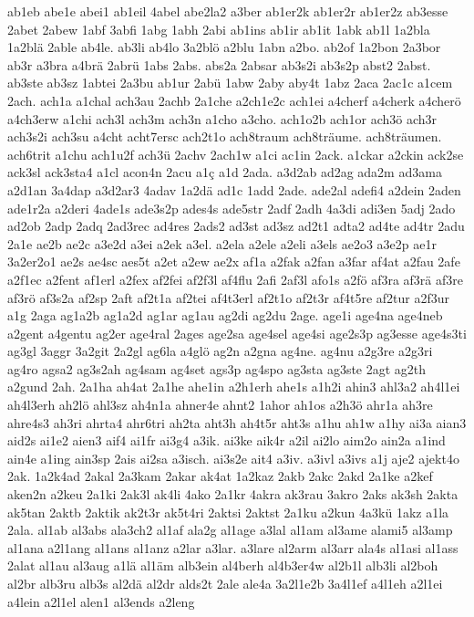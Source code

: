 {ab1eb
abe1e
abei1
ab1eil
4abel
abe2la2
a3ber
ab1er2k
ab1er2r
ab1er2z
ab3esse
2abet
2abew
1abf
3abfi
1abg
1abh
2abi
ab1ins
ab1ir
ab1it
1abk
ab1l
1a2bla
1a2blä
2able
ab4le.
ab3li
ab4lo
3a2blö
a2blu
1abn
a2bo.
ab2of
1a2bon
2a3bor
ab3r
a3bra
a4brä
2abrü
1abs
2abs.
abs2a
2absar
ab3s2i
ab3s2p
abst2
2abst.
ab3ste
ab3sz
1abtei
2a3bu
ab1ur
2abü
1abw
2aby
aby4t
1abz
2aca
2ac1c
a1cem
2ach.
ach1a
a1chal
ach3au
2achb
2a1che
a2ch1e2c
ach1ei
a4cherf
a4cherk
a4cherö
a4ch3erw
a1chi
ach3l
ach3m
ach3n
a1cho
a3cho.
ach1o2b
ach1or
ach3ö
ach3r
ach3s2i
ach3su
a4cht
acht7ersc
ach2t1o
ach8traum
ach8träume.
ach8träumen.
ach6trit
a1chu
ach1u2f
ach3ü
2achv
2ach1w
a1ci
ac1in
2ack.
a1ckar
a2ckin
ack2se
ack3sl
ack3sta4
a1cl
acon4n
2acu
a1ç
a1d
2ada.
a3d2ab
ad2ag
ada2m
ad3ama
a2d1an
3a4dap
a3d2ar3
4adav
1a2dä
ad1c
1add
2ade.
ade2al
adefi4
a2dein
2aden
ade1r2a
a2deri
4ade1s
ade3s2p
ades4s
ade5str
2adf
2adh
4a3di
adi3en
5adj
2ado
ad2ob
2adp
2adq
2ad3rec
ad4res
2ads2
ad3st
ad3sz
ad2t1
adta2
ad4te
ad4tr
2adu
2a1e
ae2b
ae2c
a3e2d
a3ei
a2ek
a3el.
a2ela
a2ele
a2eli
a3els
ae2o3
a3e2p
ae1r
3a2er2o1
ae2s
ae4sc
aes5t
a2et
a2ew
ae2x
af1a
a2fak
a2fan
a3far
af4at
a2fau
2afe
a2f1ec
a2fent
af1erl
a2fex
af2fei
af2f3l
af4flu
2afi
2af3l
afo1s
a2fö
af3ra
af3rä
af3re
af3rö
af3s2a
af2sp
2aft
af2t1a
af2tei
af4t3erl
af2t1o
af2t3r
af4t5re
af2tur
a2f3ur
a1g
2aga
ag1a2b
ag1a2d
ag1ar
ag1au
ag2di
ag2du
2age.
age1i
age4na
age4neb
a2gent
a4gentu
ag2er
age4ral
2ages
age2sa
age4sel
age4si
age2s3p
ag3esse
age4s3ti
ag3gl
3aggr
3a2git
2a2gl
ag6la
a4glö
ag2n
a2gna
ag4ne.
ag4nu
a2g3re
a2g3ri
ag4ro
agsa2
ag3s2ah
ag4sam
ag4set
ags3p
ag4spo
ag3sta
ag3ste
2agt
ag2th
a2gund
2ah.
2a1ha
ah4at
2a1he
ahe1in
a2h1erh
ahe1s
a1h2i
ahin3
ahl3a2
ah4l1ei
ah4l3erh
ah2lö
ahl3sz
ah4n1a
ahner4e
ahnt2
1ahor
ah1os
a2h3ö
ahr1a
ah3re
ahre4s3
ah3ri
ahrta4
ahr6tri
ah2ta
aht3h
ah4t5r
aht3s
a1hu
ah1w
a1hy
ai3a
aian3
aid2s
ai1e2
aien3
aif4
ai1fr
ai3g4
a3ik.
ai3ke
aik4r
a2il
ai2lo
aim2o
ain2a
a1ind
ain4e
a1ing
ain3sp
2ais
ai2sa
a3isch.
ai3s2e
ait4
a3iv.
a3ivl
a3ivs
a1j
aje2
ajekt4o
2ak.
1a2k4ad
2akal
2a3kam
2akar
ak4at
1a2kaz
2akb
2akc
2akd
2a1ke
a2kef
aken2n
a2keu
2a1ki
2ak3l
ak4li
4ako
2a1kr
4akra
ak3rau
3akro
2aks
ak3sh
2akta
ak5tan
2aktb
2aktik
ak2t3r
ak5t4ri
2aktsi
2aktst
2a1ku
a2kun
4a3kü
1akz
a1la
2ala.
al1ab
al3abs
ala3ch2
al1af
ala2g
al1age
a3lal
al1am
al3ame
alami5
al3amp
al1ana
a2l1ang
al1ans
al1anz
a2lar
a3lar.
a3lare
al2arm
al3arr
ala4s
al1asi
al1ass
2alat
al1au
al3aug
a1lä
al1äm
alb3ein
al4berh
al4b3er4w
al2b1l
alb3li
al2boh
al2br
alb3ru
alb3s
al2dä
al2dr
alds2t
2ale
ale4a
3a2l1e2b
3a4l1ef
a4l1eh
a2l1ei
a4lein
a2l1el
alen1
al3ends
a2leng
}

